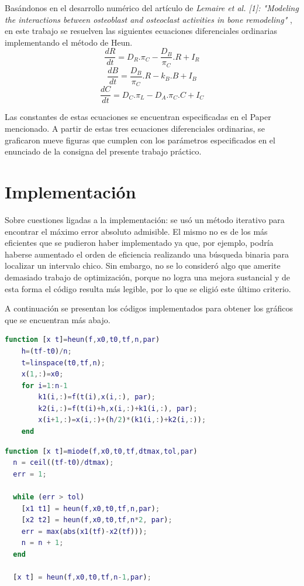 \hspace{1cm}Bas\'andonos en el desarrollo num\'erico del art\'iculo de \textit{Lemaire et al. [1]: "Modeling the interactions between osteoblast and osteoclast activities in bone remodeling" }, en este trabajo se resuelven las siguientes ecuaciones diferenciales ordinarias implementando el m\'etodo de Heun.
$$ \frac{dR}{dt} = D_R . \pi_C - \frac{D_B}{\pi_C} . R + I_R$$
$$ \frac{dB}{dt} = \frac{D_B}{\pi_C} . R - k_B . B + I_B$$
$$ \frac{dC}{dt} = D_C . \pi_L - D_A . \pi_C . C + I_C$$

\hspace{1cm}Las constantes de estas ecuaciones se encuentran especificadas en el Paper mencionado. A partir de estas tres ecuaciones diferenciales ordinarias, se graficaron nueve figuras 	que cumplen con los par\'ametros especificados en el enunciado de la consigna del presente trabajo pr\'actico.


\section{Implementaci\'on}

\hspace{1cm}Sobre cuestiones ligadas a la implementación: se usó un método iterativo para encontrar el máximo error absoluto admisible. El mismo no es de los más eficientes que se pudieron haber implementado ya que, por ejemplo, podría haberse aumentado el orden de eficiencia realizando una búsqueda binaria para localizar un intervalo chico. Sin embargo, no se lo consider\'o algo que amerite demasiado trabajo de optimización, porque no logra una mejora sustancial y de esta forma el código resulta más legible, por lo que se eligió este último criterio.

\hspace{1cm}A continuaci\'on se presentan los c\'odigos implementados para obtener los gr\'aficos que se encuentran m\'as abajo.

\begin{lstlisting}[language=Matlab, caption=heun.m]
function [x t]=heun(f,x0,t0,tf,n,par)
    h=(tf-t0)/n;
    t=linspace(t0,tf,n);
    x(1,:)=x0;
    for i=1:n-1
        k1(i,:)=f(t(i),x(i,:), par);
        k2(i,:)=f(t(i)+h,x(i,:)+k1(i,:), par);
        x(i+1,:)=x(i,:)+(h/2)*(k1(i,:)+k2(i,:));
    end
\end{lstlisting}

\begin{lstlisting}[language=Matlab, caption=miode.m]
function [x t]=miode(f,x0,t0,tf,dtmax,tol,par)
  n = ceil((tf-t0)/dtmax);
  err = 1;
  
  while (err > tol)
    [x1 t1] = heun(f,x0,t0,tf,n,par); 
    [x2 t2] = heun(f,x0,t0,tf,n*2, par);
    err = max(abs(x1(tf)-x2(tf)));
    n = n + 1;
  end
  
  [x t] = heun(f,x0,t0,tf,n-1,par); 
\end{lstlisting}

